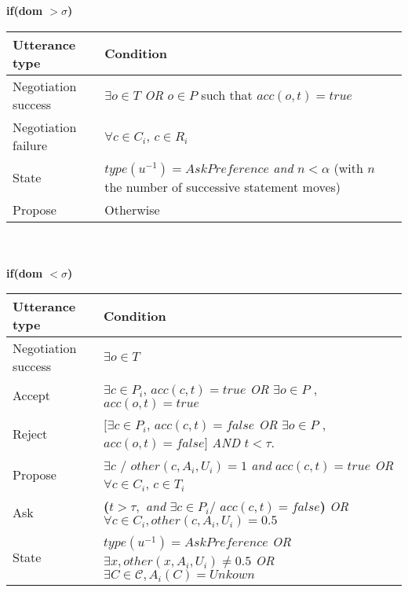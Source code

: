 \documentclass{article}
\begin{document}
	
	\textbf{if(\textbf{dom  $>\sigma$})} \\
	\begin{tabular}{|p{3cm}|p{9cm}|}
		\hline
		\textbf{Utterance type} & Condition \\
		\hline
	 Negotiation success & $\exists o \in T$   \emph{OR} $o \in P$ such that  $acc(o,t) = true$ \\
		\hline
		Negotiation failure & $ \forall c \in C_i$,  $c \in R_i$\\
		\hline
		State & $type(u^{-1}) = AskPreference$  \textit{ and }
		$n < \alpha$ (with $n$ the number of successive statement moves)\\
		\hline
		Propose & Otherwise  \\
		
	\hline
	\end{tabular}
	\\ \\
		
	\textbf{if(\textbf{dom  $<\sigma$})} \\
	
	\begin{tabular}{|p{3cm}|p{9cm}|}
		\hline
		\textbf{Utterance type} & Condition \\
		\hline
		Negotiation success &  $\exists o \in T$ \\
		\hline
		Accept & $\exists c \in P_i$, $acc(c, t)=true $ \newline \emph{OR}   \newline $ \exists o \in P$ ,  $acc(o, t) =true$ \\
		\hline
		Reject & $ [\exists c \in P_i$, $acc(c, t)= false $  \emph{OR}   $ \exists o \in P$ ,  $acc(o, t)=false]$ \newline  \emph{AND} $t<\tau$.\\
		\hline
		Propose & $\exists c$ / $other(c, A_i, U_i)  = 1 $  \emph{and}
		\newline $acc(c, t)=true$
		\newline \emph{OR}  
		\newline $\forall c \in C_i$,  $c \in T_i$\\
		\hline
		Ask &  \textbf{(}$t> \tau,$ \emph{and} 
		$\exists c \in P_i /$
		 $ acc(c, t)=false$\textbf{) }
		\newline \emph{OR}
		\newline $ \forall c \in C_i,other(c, A_i, U_i)=0.5$ \\
		\hline
		
		State & $type(u^{-1}) = AskPreference$
		\newline \emph{OR}
		\newline $\exists x,other(x, A_i, U_i) \not = 0.5 $ 
		\newline \emph{OR}
		\newline $ \exists C \in \mathcal{C}, A_i(C) = Unkown$
		\\
		\hline
	\end{tabular}
	
\end{document}
